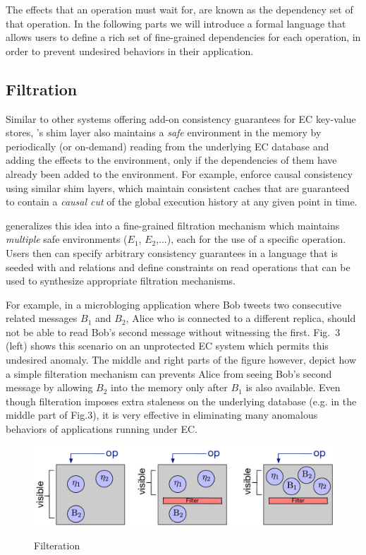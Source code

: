 \documentclass[authorversion]{sig-alternate-05-2015}
\begin{document}
The effects that an operation must wait for, are known as the dependency set of that operation. 
In the following parts we will introduce a formal language that allows users to define 
a rich set of fine-grained dependencies for each operation, in order to 
prevent undesired behaviors in their application.

\subsection{Filtration}
Similar to other systems offering add-on consistency guarantees for EC
key-value stores, \tool's shim layer also maintains
a \emph{safe} environment in the memory by periodically (or on-demand)
reading from the underlying EC database and adding the effects to the
environment, only if the dependencies of them have already been added to
the environment. 
For example, \cite{bolton,quelea} enforce causal
consistency using similar shim layers, which maintain consistent caches
that are guaranteed to
contain a \emph{causal cut} of the global execution history at any
given point in time.

\tool\; generalizes this idea into a fine-grained filtration mechanism
which maintains \emph{multiple} safe environments ($E_1$, $E_2$,...),
each for the use of a specific operation. Users then can specify arbitrary
consistency guarantees in a
language that is seeded with \sor and \visib relations and define constraints 
on read operations that can be used to synthesize appropriate filtration  mechanisms.

For example, in a microbloging application where Bob tweets two
consecutive related
messages $B_1$ and $B_2$, Alice who is connected to a different replica, should not be
able to read Bob's second message without witnessing the first. 
Fig.~3 (left) shows this scenario on an unprotected EC system which
permits this undesired anomaly. The middle and right parts of the figure
however,
depict how a simple
filteration mechanism can prevents Alice from seeing Bob's second
message by allowing $B_2$ into the memory only after $B_1$ is also
available. Even though filteration imposes extra staleness on the
underlying database (e.g. in the middle part of Fig.3), it is very
effective in eliminating many anomalous behaviors of applications
running under EC.

\begin{figure}[h]
\centering
\includegraphics[scale=0.37]{Figures/ub.pdf}
\label{fig:filter}
\caption{Filteration}
\end{figure}
\end{document}
